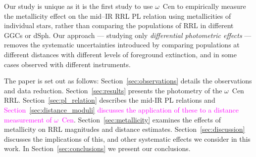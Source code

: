\documentclass[a4paper,fleqn,usenatbib]{mnras}
\newcommand{\ocen}{$\omega$~Cen\xspace}
\begin{document}
Our study is unique as it is the first study to use \ocen to empirically measure the metallicity effect on the mid--IR RRL PL relation using metallicities of individual stars, rather than comparing the populations of RRL in different GGCs or dSph. Our approach --- studying only {\it differential photometric effects} --- removes the systematic uncertainties introduced by comparing populations at different distances with different levels of foreground extinction, and in some cases observed with different instruments.

The paper is set out as follows: Section~\ref{sec:observations} details the observations and data reduction. Section~\ref{sec:results} presents the photometry of the \ocen RRL. Section~\ref{sec:pl_relation} describes the mid-IR PL relations and \textcolor{magenta}{Section~\ref{sec:distance_moduli} discusses the application of these to a distance measurement of  \ocen}. Section~\ref{sec:metallicity} examines the effects of metallicity on RRL magnitudes and distance estimates. Section~\ref{sec:discussion} discusses the implications of this, and other systematic effects we consider in this work. In Section~\ref{sec:conclusions} we present our conclusions.


\end{document}
